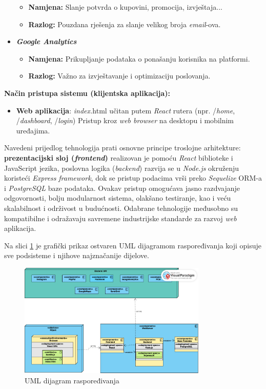 \begin{itemize}
\begin{itemize}
        \item \textbf{Namjena:} Slanje potvrda o kupovini, promocija, izvještaja...
        \item \textbf{Razlog:} Pouzdana rješenja za slanje velikog broja \textit{email}-ova.
    \end{itemize}
    \item \textbf{\textit{Google Analytics}}\begin{itemize}
        \item \textbf{Namjena:} Prikupljanje podataka o ponašanju korisnika na platformi.
        \item \textbf{Razlog:} Važno za izvještavanje i optimizaciju poslovanja.
    \end{itemize}
\end{itemize} 
\textbf{Način pristupa sistemu (klijentska aplikacija):}
\begin{itemize}  
    \item \textbf{Web aplikacija}: \textit{index.}html učitan putem \textit{React} rutera (npr. /\textit{home}, /\textit{dashboard}, /\textit{login}) 
    Pristup kroz \textit{web browser} na desktopu i mobilnim uređajima.
\end{itemize} 
Navedeni prijedlog tehnologija prati osnovne principe troslojne arhitekture: \textbf{prezentacijski sloj (\textit{frontend})} realizovan je pomoću \textit{React} biblioteke i JavaScript jezika, poslovna logika (\textit{backend}) razvija se u \textit{Node.js }okruženju koristeći \textit{Express} \textit{framework}, dok se pristup podacima vrši preko \textit{Sequelize} ORM-a i \textit{PostgreSQL} baze podataka. Ovakav pristup omogućava jasno razdvajanje odgovornosti, bolju modularnost sistema, olakšano testiranje, kao i veću skalabilnost i održivost u budućnosti. Odabrane tehnologije međusobno su kompatibilne i odražavaju savremene industrijske standarde za razvoj \textit{web} aplikacija.

Na slici \ref{fig:arh3} je grafički prikaz ostvaren UML dijagramom raspoređivanja koji opisuje sve podsisteme i njihove najznačanije dijelove.

\begin{figure}[H]
    \centering
    \includegraphics[width=0.8\textwidth]{Slike/Arhitektura/mrzimvpd.png}
    \caption{UML dijagram raspoređivanja}
    \label{fig:arh3}
\end{figure}

